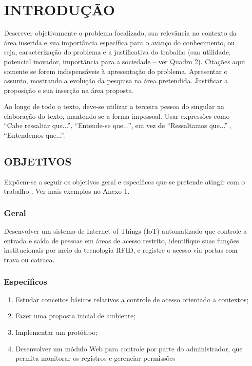 \chapter{INTRODUÇÃO}\label{chp:INTRODUCAO}

Descrever objetivamente o problema focalizado, sua relevância no contexto da área inserida e sua importância específica para o avanço do conhecimento, ou seja, caracterização do problema e a justificativa do trabalho (sua utilidade, potencial inovador, importância para a sociedade – ver Quadro 2). Citações aqui somente se forem indispensáveis à apresentação do problema. Apresentar o assunto, mostrando a evolução da pesquisa na área pretendida. Justificar a proposição e sua inserção na área proposta.

Ao longo de todo o texto, deve-se utilizar a terceira pessoa do singular na elaboração do texto, mantendo-se a forma impessoal. Usar expressões como “Cabe ressaltar que...”, “Entende-se que...”, em vez de “Ressaltamos que...” , “Entendemos que...”. 


\section{OBJETIVOS}\label{sec:OBJETIVOS}
Expõem-se a seguir os objetivos geral e específicos que se pretende atingir com o trabalho . Ver mais exemplos no Anexo 1. 

\subsection{Geral}\label{sec:Geral}
Desenvolver um sistema de Internet of Things (IoT) automatizado que controle a entrada e saída de pessoas em áreas de acesso restrito, identifique suas funções institucionais por meio da tecnologia RFID, e registre o acesso via portas com trava ou catraca.


\subsection{Específicos}\label{sec:Especificos}
\begin{enumerate}
	\item Estudar conceitos básicos relativos a controle de acesso orientado a contextos; 
	
	\item Fazer uma proposta inicial de ambiente;
	
	\item Implementar um protótipo;
	
	\item Desenvolver um módulo Web para controle por parte do administrador, que permita monitorar os registros e gerenciar permissões
\end{enumerate}


